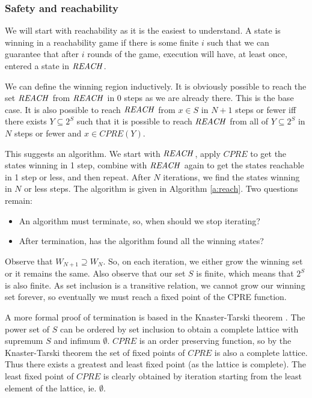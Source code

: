 \subsubsection{Safety and reachability}

We will start with reachability as it is the easiest to understand. A state is winning in a reachability game if there is some finite $i$ such that we can guarantee that after $i$ rounds of the game, execution will have, at least once, entered a state in $\mathit{REACH}$.

We can define the winning region inductively. It is obviously possible to reach the set $\mathit{REACH}$ from $\mathit{REACH}$ in 0 steps as we are already there. This is the base case. It is also possible to reach $\mathit{REACH}$ from $x \in S$ in $N + 1$ steps or fewer iff there exists $Y\subseteq 2^S$ such that it is possible to reach $\mathit{REACH}$ from all of $Y \subseteq 2^S$ in $N$ steps or fewer and $x \in CPRE(Y)$.

This suggests an algorithm. We start with $\mathit{REACH}$, apply $CPRE$ to get the states winning in 1 step, combine with $\mathit{REACH}$ again to get the states reachable in 1 step or less, and then repeat. After $N$ iterations, we find the states winning in $N$ or less steps. The algorithm is given in Algorithm \ref{a:reach}. Two questions remain: 

\begin{itemize}
    \item An algorithm must terminate, so, when should we stop iterating?
    \item After termination, has the algorithm found all the winning states?
\end{itemize}

Observe that $W_{N+1} \supseteq W_N$. So, on each iteration, we either grow the winning set or it remains the same. Also observe that our set $S$ is finite, which means that $2^S$ is also finite. As set inclusion is a transitive relation, we cannot grow our winning set forever, so eventually we must reach a fixed point of the CPRE function. 

A more formal proof of termination is based in the Knaster-Tarski theorem \cite{knaster_tarski}. The power set of $S$ can be ordered by set inclusion to obtain a complete lattice with supremum $S$ and infimum $\emptyset$. $CPRE$ is an order preserving function, so by the Knaster-Tarski theorem the set of fixed points of $CPRE$ is also a complete lattice. Thus there exists a greatest and least fixed point (as the lattice is complete). The least fixed point of $CPRE$ is clearly obtained by iteration starting from the least element of the lattice, ie. $\emptyset$. 

